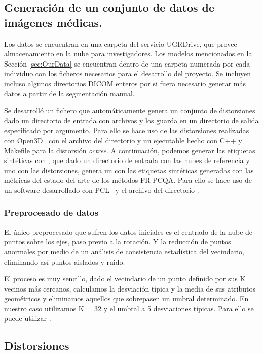 \subsection*{Generación de un conjunto de datos de imágenes médicas.}
Los datos se encuentran en una carpeta del servicio UGRDrive, que provee almacenamiento 
en la nube para investigadores. Los modelos mencionados en la Sección \ref{sec:OurData} 
se encuentran dentro de una carpeta numerada por cada individuo con los ficheros 
necesarios para el desarrollo del proyecto. Se incluyen incluso algunos directorios 
DICOM enteros por si fuera necesario generar más datos a partir de la segmentación 
manual. 

Se desarrolló un fichero  que automáticamente genera 
un conjunto de distorsiones dado un directorio de entrada con archivos  y los 
guarda en un directorio de salida especificado por argumento. Para ello se hace 
uso de las distorsiones realizadas con Open3D~\cite{Open3D} 
con el archivo del directorio  y un ejecutable hecho 
con C++ y Makefile para la distorsión \emph{octree}. A continuación, 
podemos generar las etiquetas sintéticas con , que dado un 
directorio de entrada con las nubes de referencia y uno con las distorsiones, 
genera un  con las etiquetas sintéticas generadas con las métricas 
del estado del arte de los métodos FR-PCQA. Para ello se hace uso de un 
software desarrollado con PCL~\cite{PCL} y el archivo del directorio . 

\subsubsection*{Preprocesado de datos}
El único preprocesado que sufren los datos iniciales es el centrado de la nube 
de puntos sobre los ejes, paso previo a la rotación. Y la reducción de puntos 
anormales por medio de un análisis de consistencia estadística del vecindario,
eliminando así puntos aislados y ruido. 

El proceso es muy sencillo, dado el vecindario de un punto definido por sus 
K vecinos más cercanos, calculamos la desviación típica y la media de sus atributos 
geométricos y eliminamos aquellos que sobrepasen un umbral determinado. 
En nuestro caso utilizamos K = 32 y el umbral a 5 desviaciones típicas. Para 
ello se puede utilizar .

\subsection*{Distorsiones}
\label{sec:DatosSinteticos}
